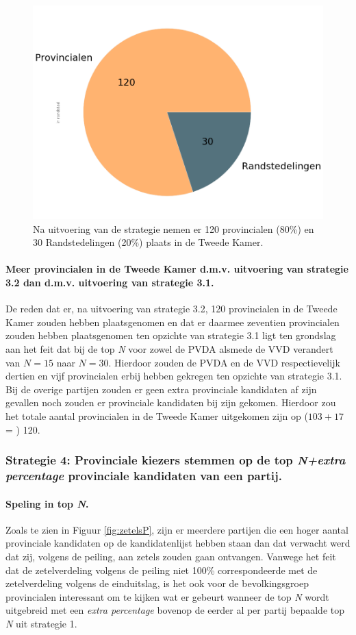 \begin{figure}[H]
\centering
	\includegraphics[width=0.45\linewidth]{pie_chart_eigenX_provincialen.png}

\caption{Na uitvoering van de strategie nemen er 120 provincialen (80\%) en 30 Randstedelingen (20\%) plaats in de Tweede Kamer.}

\label{fig:pcS32P}
\end{figure}

\paragraph{Meer provincialen in de Tweede Kamer d.m.v. uitvoering van strategie 3.2 dan d.m.v. uitvoering van strategie 3.1.}
De reden dat er, na uitvoering van strategie 3.2, 120 provincialen in de Tweede Kamer zouden hebben plaatsgenomen en dat er daarmee zeventien provincialen zouden hebben plaatsgenomen ten opzichte van strategie 3.1 ligt ten grondslag aan het feit dat bij de top \textit{N} voor zowel de PVDA alsmede de VVD verandert van $N=15$ naar $N=30$. Hierdoor zouden de PVDA en de VVD respectievelijk dertien en vijf provincialen erbij hebben gekregen ten opzichte van strategie 3.1. Bij de overige partijen zouden er geen extra provinciale kandidaten af zijn gevallen noch zouden er provinciale kandidaten bij zijn gekomen. Hierdoor zou het totale aantal provincialen in de Tweede Kamer uitgekomen zijn op ($103+17$ = ) 120.

\subsubsection{Strategie 4: Provinciale kiezers stemmen op de top \textit{N+extra percentage} provinciale kandidaten van een partij.}
\label{S4P}

\paragraph{Speling in top \textit{N}.}
Zoals te zien in Figuur \ref{fig:zetelsP}, zijn er meerdere partijen die een hoger aantal provinciale kandidaten op de kandidatenlijst hebben staan dan dat verwacht werd dat zij, volgens de peiling, aan zetels zouden gaan ontvangen. Vanwege het feit dat de zetelverdeling volgens de peiling niet 100\% correspondeerde met de zetelverdeling volgens de einduitslag, is het ook voor de bevolkingsgroep provincialen interessant om te kijken wat er gebeurt wanneer de top \textit{N} wordt uitgebreid met een \textit{extra percentage} bovenop de eerder al per partij bepaalde top \textit{N} uit strategie 1.



